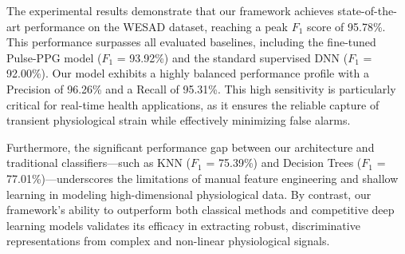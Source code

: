 \documentclass[journal,twoside,web]{ieeecolor}
\begin{document}
The experimental results demonstrate that our framework achieves state-of-the-art performance on the WESAD dataset, reaching a peak $F_1$ score of 95.78\%. This performance surpasses all evaluated baselines, including the fine-tuned Pulse-PPG model ($F_1$ = 93.92\%) and the standard supervised DNN ($F_1$ = 92.00\%). Our model exhibits a highly balanced performance profile with a Precision of 96.26\% and a Recall of 95.31\%. This high sensitivity is particularly critical for real-time health applications, as it ensures the reliable capture of transient physiological strain while effectively minimizing false alarms.

Furthermore, the significant performance gap between our architecture and traditional classifiers—such as KNN ($F_1$ = 75.39\%) and Decision Trees ($F_1$ = 77.01\%)—underscores the limitations of manual feature engineering and shallow learning in modeling high-dimensional physiological data. By contrast, our framework’s ability to outperform both classical methods and competitive deep learning models validates its efficacy in extracting robust, discriminative representations from complex and non-linear physiological signals.
\end{document}
